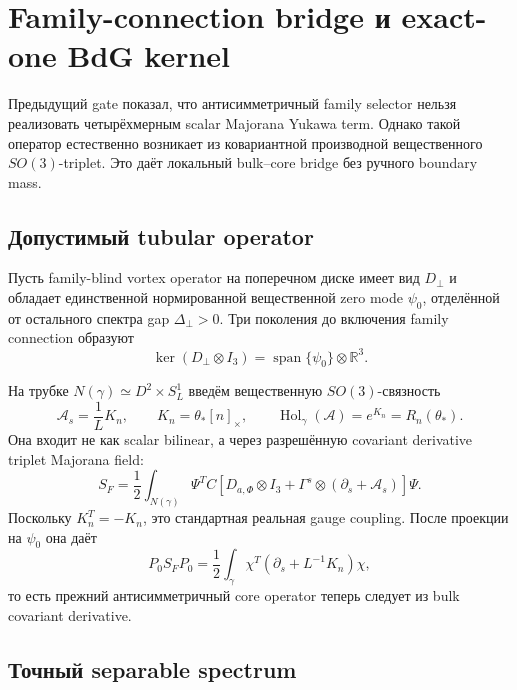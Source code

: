 \chapter{Family-connection bridge и exact-one BdG kernel}

Предыдущий gate показал, что антисимметричный family selector нельзя
реализовать четырёхмерным scalar Majorana Yukawa term. Однако такой оператор
естественно возникает из ковариантной производной вещественного
\(SO(3)\)-triplet. Это даёт локальный bulk--core bridge без ручного
boundary mass.

\section{Допустимый tubular operator}

Пусть family-blind vortex operator на поперечном диске имеет вид
\(D_\perp\) и обладает единственной нормированной вещественной zero mode
\(\psi_0\), отделённой от остального спектра gap \(\Delta_\perp>0\).
Три поколения до включения family connection образуют
\begin{equation}
 \ker(D_\perp\otimes I_3)
 =\operatorname{span}\{\psi_0\}\otimes\mathbb R^3.
\end{equation}

На трубке \(N(\gamma)\simeq D^2\times S^1_L\) введём вещественную
\(SO(3)\)-связность
\begin{equation}
 \mathcal A_s=\frac1L K_n,
 \qquad
 K_n=\theta_*[n]_\times,
 \qquad
 \operatorname{Hol}_\gamma(\mathcal A)=e^{K_n}=R_n(\theta_*).
\end{equation}
Она входит не как scalar bilinear, а через разрешённую covariant derivative
triplet Majorana field:
\begin{equation}
 S_F=\frac12\int_{N(\gamma)}
 \Psi^TC\left[
 D_{a,\Phi}\otimes I_3+
 \Gamma^s\otimes(\partial_s+\mathcal A_s)
 \right]\Psi.
\end{equation}
Поскольку \(K_n^T=-K_n\), это стандартная реальная gauge coupling. После
проекции на \(\psi_0\) она даёт
\begin{equation}
 P_0S_FP_0
 =\frac12\int_\gamma
 \chi^T(\partial_s+L^{-1}K_n)\chi,
\end{equation}
то есть прежний антисимметричный core operator теперь следует из bulk
covariant derivative.

\section{Точный separable spectrum}

